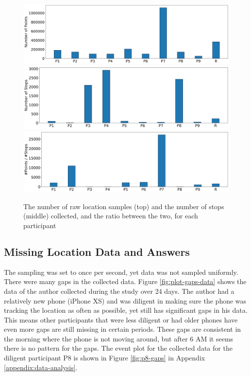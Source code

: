 \begin{figure}
    \centering
    \includegraphics[width=\textwidth]{images/study/storage/num_points.png}
    \includegraphics[width=\textwidth]{images/study/storage/num_stops.png}
    \includegraphics[width=\textwidth]{images/study/storage/compression_N.png}
    \caption{The number of raw location samples (top) and the number of stops (middle) collected, and the ratio between the two, for each participant}
    \label{fig:plot-num-points-stops}
\end{figure}


\subsection{Missing Location Data and Answers}
The sampling was set to once per second, yet data was not sampled uniformly. There were many gaps in the collected data. Figure \ref{fig:plot-gaps-data} shows the data of the author collected during the study over 24 days. The author had a relatively new phone (iPhone XS) and was diligent in making sure the phone was tracking the location as often as possible, yet still has significant gaps in his data. This means other participants that were less diligent or had older phones have even more gaps are still missing in certain periods. These gaps are consistent in the morning where the phone is not moving around, but after 6 AM it seems there is no pattern for the gaps. The event plot for the collected data for the diligent participant P8 is shown in Figure \ref{fig:p8-gaps} in Appendix \ref{appendix:data-analysis}. \\

